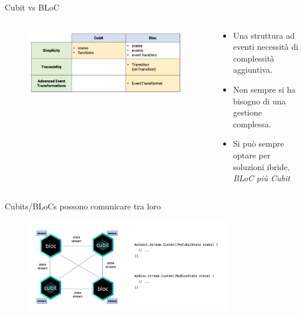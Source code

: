 \documentclass{../libs/presentation_format}
\begin{document}

\begin{frame}{Cubit vs BLoC}
	\begin{minipage}[0.2\textheight]{\textwidth}
		\begin{columns}[T]
			\begin{column}{0.4\textwidth}
				\begin{figure}[htpb]
					\centering
					\includegraphics[scale=0.15]{../libs/cubit-bloc-diffs}
				\end{figure}
			\end{column}
			\begin{column}{0.6\textwidth}
				\begin{itemize}
					\item Una struttura ad eventi necessità di complessità aggiuntiva.
					\item Non sempre si ha bisogno di una gestione complessa.
					\item Si può sempre optare per soluzioni ibride, 	\emph{BLoC più Cubit}
				\end{itemize}
			\end{column}
		\end{columns}
	\end{minipage}
\end{frame}


\begin{frame}{Cubits/BLoCs possono comunicare tra loro}
	\begin{figure}[htpb]
		\centering
		\includegraphics[width=9cm]{../libs/cubit-bloc-stream-communication}
	\end{figure}
\end{frame}
\end{document}
